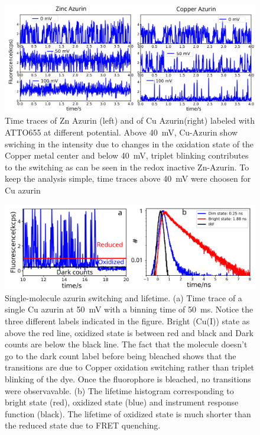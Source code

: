 \begin{figure}
  \centering
  \includegraphics[width=\textwidth,keepaspectratio]{SI_timetrace_Zn_Cu}
  \makeatletter
  \renewcommand{\fnum@figure}{\figurename~S\thefigure}
  \makeatother
  \caption{Time traces of Zn Azurin (left) and of Cu Azurin(right) labeled with ATTO655 at different potential. 
  Above \SI{40}{\mV}, Cu-Azurin show swiching in the intensity due to changes in the oxidation state of the Copper metal center and below \SI{40}{\mV}, triplet blinking contributes to the switching as can be seen in the redox inactive Zn-Azurin.
  To keep the analysis simple, time traces above \SI{40}{\mV} were choosen for Cu azurin}
  \label{SIfig:tracecomparision}
\end{figure}
\begin{figure}
  \centering
  \includegraphics[width=\textwidth]{lifetime}
  \makeatletter
  \renewcommand{\fnum@figure}{\figurename~S\thefigure}
  \makeatother
  \caption{Single-molecule azurin switching and lifetime. (a) Time trace of a single Cu azurin at \SI{50}{\mV} with a binning time of \SI{50}{\ms}.
  Notice the three different labels indicated in the figure. Bright (Cu(I)) state as above the red line, oxidized state is between red and black and Dark counts are below the black line. The fact that the molecule doesn't go to the dark count label before being bleached shows that the transitions are due to Copper oxidation switching rather than triplet blinking of the dye.
  Once the fluorophore is bleached, no transitions were observavable.
  (b) The lifetime histogram corresponding to bright state (red), oxidized state (blue) and instrument response function (black).
  The lifetime of oxidized state is much shorter than the reduced state due to FRET quenching.}
  \label{SIfig: lifetime}
\end{figure}
